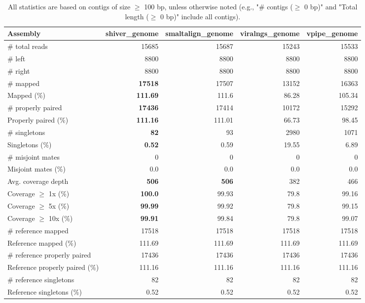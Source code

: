 \documentclass[12pt,a4paper]{article}
\begin{document}
\begin{table}[ht]
\begin{center}
\caption{All statistics are based on contigs of size $\geq$ 100 bp, unless otherwise noted (e.g., "\# contigs ($\geq$ 0 bp)" and "Total length ($\geq$ 0 bp)" include all contigs).}
\begin{tabular}{|l*{4}{|r}|}
\hline
Assembly & shiver\_genome & smaltalign\_genome & viralngs\_genome & vpipe\_genome \\ \hline
\# total reads & 15685 & 15687 & 15243 & 15533 \\ \hline
\# left & 8800 & 8800 & 8800 & 8800 \\ \hline
\# right & 8800 & 8800 & 8800 & 8800 \\ \hline
\# mapped & {\bf 17518} & 17507 & 13152 & 16363 \\ \hline
Mapped (\%) & {\bf 111.69} & 111.6 & 86.28 & 105.34 \\ \hline
\# properly paired & {\bf 17436} & 17414 & 10172 & 15292 \\ \hline
Properly paired (\%) & {\bf 111.16} & 111.01 & 66.73 & 98.45 \\ \hline
\# singletons & {\bf 82} & 93 & 2980 & 1071 \\ \hline
Singletons (\%) & {\bf 0.52} & 0.59 & 19.55 & 6.89 \\ \hline
\# misjoint mates & 0 & 0 & 0 & 0 \\ \hline
Misjoint mates (\%) & 0.0 & 0.0 & 0.0 & 0.0 \\ \hline
Avg. coverage depth & {\bf 506} & {\bf 506} & 382 & 466 \\ \hline
Coverage $\geq$ 1x (\%) & {\bf 100.0} & 99.93 & 79.8 & 99.16 \\ \hline
Coverage $\geq$ 5x (\%) & {\bf 99.99} & 99.92 & 79.8 & 99.15 \\ \hline
Coverage $\geq$ 10x (\%) & {\bf 99.91} & 99.84 & 79.8 & 99.07 \\ \hline
\# reference mapped & 17518 & 17518 & 17518 & 17518 \\ \hline
Reference mapped (\%) & 111.69 & 111.69 & 111.69 & 111.69 \\ \hline
\# reference properly paired & 17436 & 17436 & 17436 & 17436 \\ \hline
Reference properly paired (\%) & 111.16 & 111.16 & 111.16 & 111.16 \\ \hline
\# reference singletons & 82 & 82 & 82 & 82 \\ \hline
Reference singletons (\%) & 0.52 & 0.52 & 0.52 & 0.52 \\ \hline

\end{tabular}
\end{center}
\end{table}
\end{document}
